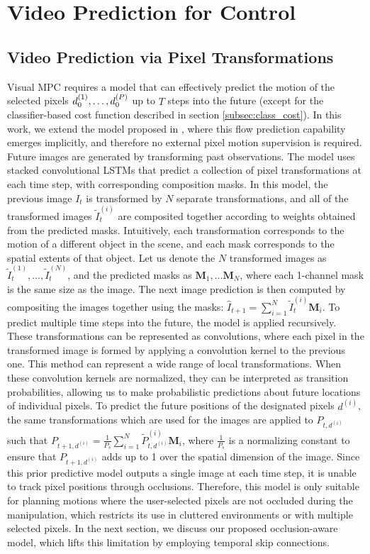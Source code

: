 \section{Video Prediction for Control}

\subsection{Video Prediction via Pixel Transformations}
\label{sec:model}
Visual MPC requires a model that can effectively predict the motion of the selected pixels $d_0^{(1)}, \dots, d_0^{(P)}$ up to $T$ steps into the future (except for the classifier-based cost function described in section \ref{subsec:class_cost}).
In this work, we extend the model proposed in \cite{finn_nips}, where this flow prediction capability emerges implicitly, and therefore no external pixel motion supervision is required. Future images are generated by transforming past observations. The model uses stacked convolutional LSTMs that predict a collection of pixel transformations at each time step, with corresponding composition masks. In this model, the previous image $I_t$ is transformed by $N$ separate transformations, and all of the transformed images $\tilde{I}_t^{(i)}$ are composited together according to weights obtained from the predicted masks. Intuitively, each transformation corresponds to the motion of a different object in the scene, and each mask corresponds to the spatial extents of that object. Let us denote the $N$ transformed images as $\tilde{I}_t^{(1)}, ..., \tilde{I}_t^{(N)}$, and the predicted masks as $\mathbf{M}_1, ...\mathbf{M}_N$, where each 1-channel mask is the same size as the image. The next image prediction is then computed by compositing the images together using the masks: $\hat{I}_{t+1} = \sum_{i=1}^N \tilde{I}_t^{(i)} \mathbf{M}_i$. To predict multiple time steps into the future, the model is applied recursively. These transformations can be represented as convolutions, where each pixel in the transformed image is formed by applying a convolution kernel to the previous one. This method can represent a wide range of local transformations. When these convolution kernels are normalized, they can be interpreted as transition probabilities, allowing us to make probabilistic predictions about future locations of individual pixels. To predict the future positions of the designated pixels $d^{(i)}$, the same transformations which are used for the images are applied to $P_{t,d^{(i)}}$ such that $P_{t+1,d^{(i)}} = \frac{1}{P_s}\sum_{i=1}^N \tilde P^{(i)}_{t,d^{(i)}} \mathbf{M}_i $, where $\frac{1}{P_s}$ is a normalizing constant to ensure that $P_{t+1,d^{(i)}}$ adds up to 1 over the spatial dimension of the image. Since this prior predictive model outputs a single image at each time step, it is unable to track pixel positions through occlusions. Therefore, this model is only suitable for planning motions where the user-selected pixels are not occluded during the manipulation, which restricts its use in cluttered environments or with multiple selected pixels. In the next section, we discuss our proposed occlusion-aware model, which lifts this limitation by employing temporal skip connections.

